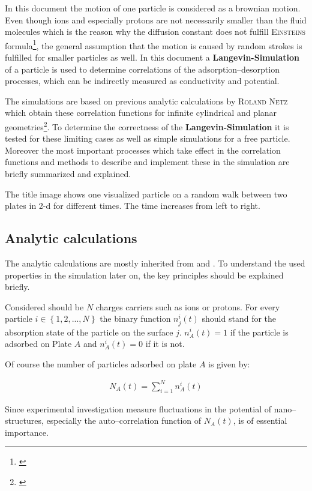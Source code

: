 \documentclass[a4paper, parskip=half]{scrartcl}
\newcommand{\person}[1]{%
	\textsc{#1}%
}
\newcommand{\effect}[1]{%
	\textbf{#1}%
}
\newcommand{\myCite}[1]{\footnote{\cite{#1} \citeauthor{#1} \citetitle{#1} \citeyear{#1}}}
\begin{document}
In this document the motion of one particle is considered as a brownian motion. Even though ions and especially protons are not necessarily smaller than the fluid molecules which is the reason why the diffusion constant does not fulfill \person{Einsteins} formula\myCite{brownian}, the general assumption that the motion is caused by random strokes is fulfilled for smaller particles as well. In this document a \effect{Langevin-Simulation} of a particle is used to determine correlations of the adsorption--desorption processes, which can be indirectly measured as conductivity and potential.

The simulations are based on previous analytic calculations by \person{Roland Netz} which obtain these correlation functions for infinite cylindrical and planar geometries\myCite{netzpaper}. To determine the correctness of the \effect{Langevin-Simulation} it is tested for these limiting cases as well as simple simulations for a free particle. Moreover the most important processes which take effect in the correlation functions and methods to describe and implement these in the simulation are briefly summarized and explained.

The title image shows one visualized particle on a random walk between two plates in 2-d for different times. The time increases from left to right. 

\newpage
\subsection{Analytic calculations}
The analytic calculations are mostly inherited from \cite{netzpaper} and \cite{netzpaper2}. To understand the used properties in the simulation later on, the key principles should be explained briefly.

Considered should be $N$ charges carriers such as ions or protons. For every particle $i\in\left\lbrace 1,2,...,N \right\rbrace$ the binary function $n_j^i(t)$ should stand for the absorption state of the particle on the surface $j$. $n_A^i(t) = 1$ if the particle is adsorbed on Plate $A$ and $n_A^i(t) = 0$ if it is not.

Of course the number of particles adsorbed on plate $A$ is given by:

\begin{align}
N_A(t) = \sum_{i=1}^N n_A^i(t)
\end{align}

Since experimental investigation measure fluctuations in the potential of nano--structures, especially the auto--correlation function of $N_A(t)$, is of essential importance.
\end{document}
